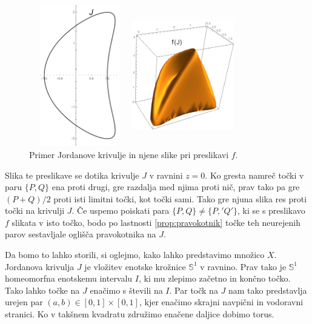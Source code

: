 \documentclass[mat1]{fmfdelo}
\begin{document}
\begin{figure}[h!]
\begin{minipage}{0.45\textwidth}
	\centering
	\includegraphics[width = 125pt, height = 175pt]{primer_krivulje.png}
\end{minipage}\hfill
\begin{minipage}{0.45\textwidth}
	\centering
	\includegraphics[width = 125pt, height = 175pt]{primer_f_krivulje.png}
\end{minipage}
\caption{Primer Jordanove krivulje in njene slike pri preslikavi $f$.}
\end{figure}

Slika te preslikave se dotika krivulje $J$ v ravnini $z=0$. Ko gresta namreč točki v paru $\{P, Q\}$ ena proti drugi, gre razdalja med njima proti nič, prav tako pa gre $(P+Q)/2$ proti isti limitni točki, kot točki sami. Tako gre njuna slika res proti točki na krivulji $J$.
Če uspemo poiskati para $\{P, Q\} \neq \{P,' Q'\}$, ki se s preslikavo $f$ slikata v isto točko, bodo po lastnosti \eqref{prop:pravokotnik} točke teh neurejenih parov sestavljale oglišča pravokotnika na $J$.

Da bomo to lahko storili, si oglejmo, kako lahko predstavimo množico $X$. Jordanova krivulja $J$ je vložitev enotske krožnice $\mathbb{S}^1$ v ravnino. Prav tako je $\mathbb{S}^1$ homeomorfna enotskemu intervalu $I$, ki mu zlepimo začetno in končno točko. Tako lahko točke na $J$ enačimo s števili na $I$. Par točk na $J$ nam tako predstavlja urejen par $(a, b) \in [0, 1] \times [0, 1]$, kjer enačimo skrajni navpični in vodoravni stranici. Ko v takšnem kvadratu združimo enačene daljice dobimo torus.
\end{document}
